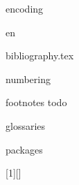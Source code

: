 \usepackage[parent]{currfile}
\usepackage{currfile-abspath}


{encoding}




%
%
{en}



{bibliography.tex}


%
%
{numbering}


%
%
{footnotes}
{todo}

{glossaries}



\usepackage{hyperref}

\usepackage{graphicx}
\usepackage{caption}

\usepackage{fancybox,framed}

{packages}



\usepackage{color}
\usepackage{listings}

\lstset{frame=single}

\lstset{language=C}

[1][]
{
    \lstset{language=tex}
    \lstset{#1} %
}
{
}

\lstset{%
    frame = single,
    basicstyle = \ttfamily\small,
    language = C
}




\usepackage{fourier} %


